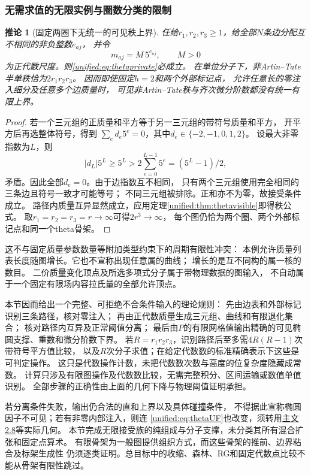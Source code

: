 \documentclass[11pt,a4paper,oneside]{ctexart}
\theoremstyle{cnplain}
\newtheorem{corollary}[theorem]{推论}
\theoremstyle{definition}
\theoremstyle{remark}
\numberwithin{equation}{section}
\newcommand{\otherref}[2]{\href{#1.pdf}{#2}}
\begin{document}
\subsubsection{无需求值的无限实例与圈数分类的限制}
\begin{corollary}[固定两圈下无统一的可见秩上界]\label{unified:cor:thetaunbounded}
任给$r_1,r_2,r_3\ge1$，给全部$N$条边分配互不相同的非负整数$e_{aj}$，
并令
\[
                    m_{aj}=M\,5^{e_{aj}},\qquad M>0
\]
为正代数尺度。则\eqref{unified:eq:thetaprivate}必成立。
在单位分子下，非Artin--Tate半单秩恰为$2r_1r_2r_3$。
因而即使固定$h=2$和两个外部标记点，
允许任意长的零注入细分及任意多个边质量时，
可见非Artin--Tate秩与齐次微分阶数都没有统一有限上界。
\end{corollary}
\begin{proof}
若一个三元组的正质量和平方等于另一三元组的带符号质量和平方，
开平方后再选整体符号，得到
$\sum_e d_e5^e=0$，其中$d_e\in\{-2,-1,0,1,2\}$。
设最大非零指数为$L$，则
\[
 |d_L|5^L\ge5^L>
       2\sum_{e=0}^{L-1}5^e=(5^L-1)/2,
\]
矛盾。因此全部$d_e=0$。由于边指数互不相同，
只有两个三元组使用完全相同的三条边且符号一致才可能等号；
不同三元组被排除。正和亦不为零，故接受条件成立。
路径内质量互异显然成立，应用定理\ref{unified:thm:thetavisible}即得秩公式。
取$r_1=r_2=r_3=r\to\infty$可得$2r^3\to\infty$，
每个图仍恰为两个圈、两个外部标记点和同一个theta骨架。
\end{proof}

这不与固定质量参数数量等附加类型约束下的周期有限性冲突：
本例允许质量列表长度随图增长。它也不宣称出现任意属的曲线；
增长的是互不同构的属一核的数目。
二价质量变化顶点及所选多项式分子属于带物理数据的图输入，
不自动属于一个固定有限场内容拉氏量的全部允许顶点。

本节因而给出一个完整、可拒绝不合条件输入的理论规则：
先由边表和外部标记识别三条路径，核对零注入；
再由正代数质量生成三元组、曲线和有限退化集合；
核对路径内互异及正常阈值分离；
最后由$P$的有限网格值输出精确的可见椭圆支撑、重数和微分阶数下界。
若$R=r_1r_2r_3$，识别路径后至多需$4R(R-1)$次带符号平方值比较，
以及$R$次分子求值；在给定代数数的标准精确表示下这些是可判定操作。
这只是代数操作计数，未把代数数次数与高度的位复杂度隐藏成常数。
计算只涉及有限图操作及代数数比较，无需完整积分、区间运输或数值单值识别。
全部步骤的正确性由上面的几何下降与物理阈值证明承担。

若分离条件失败，输出仍合法的直和上界以及具体碰撞条件，
不得据此宣称椭圆因子不可见；若有非零内部注入，则连
\eqref{unified:eq:thetaUF}也改变，须转用\otherref{feynman_periods_long_paper}{主文2.8}等实际几何。
本节完成无限接受族的纯组成与分子支撑，未分类其所有混合扩张和固定点算术。
有限骨架为一般图提供组织方式，而这些骨架的推前、边界粘合及标架生成性
仍须逐类证明。总目标中的收缩、森林、RG和固定代数点比较不能从骨架有限性跳过。
\end{document}
